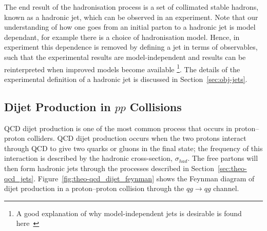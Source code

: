 The end result of the hadronisation process is a set of collimated stable hadrons,
known as a hadronic jet, which can be observed in an experiment.
Note that our understanding of how one goes from an initial parton to a hadronic jet is model dependant,
for example there is a choice of hadronisation model.
Hence, in experiment this dependence is removed by defining a jet in terms of observables,
such that the experimental results are model-independent and results can be reinterpreted when improved models become available
\footnote{A good explanation of why model-independent jets is desirable is found here~\cite{theo-jets_jb}}.
The details of the experimental definition of a hadronic jet is discussed in Section~\ref{sec:obj-jets}.


\subsection{Dijet Production in $pp$ Collisions}
\label{sec:theo-qcd_dijet}

QCD dijet production is one of the most common process that occurs in proton--proton colliders.
QCD dijet production occurs when the two protons interact through QCD to give two quarks or gluons in the final state;
the frequency of this interaction is described by the hadronic cross-section, $\sigma_{had}$.
The free partons will then form hadronic jets through the processes described in Section~\ref{sec:theo-qcd_jets}.
Figure~\ref{fig:theo-qcd_dijet_feynman} shows the Feynman diagram of
dijet production in a proton--proton collision through the $qg \to qg$ channel.

